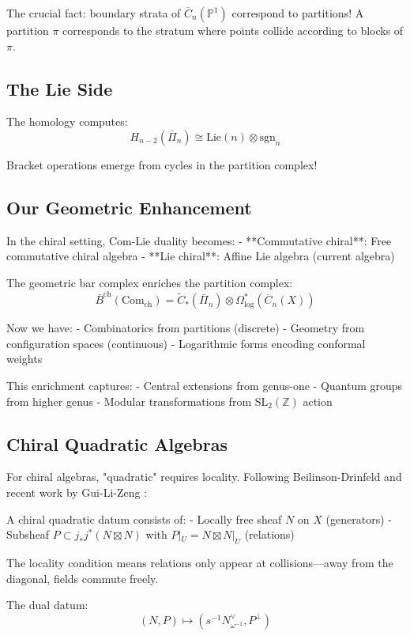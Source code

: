 The crucial fact: boundary strata of $\overline{C}_n(\mathbb{P}^1)$ correspond to partitions! A partition $\pi$ corresponds to the stratum where points collide according to blocks of $\pi$.

\subsection{The Lie Side}

The homology computes:
$$H_{n-2}(\bar{\Pi}_n) \cong \text{Lie}(n) \otimes \text{sgn}_n$$

Bracket operations emerge from cycles in the partition complex!

\subsection{Our Geometric Enhancement}

In the chiral setting, Com-Lie duality becomes:
- **Commutative chiral**: Free commutative chiral algebra
- **Lie chiral**: Affine Lie algebra (current algebra)

The geometric bar complex enriches the partition complex:
$$\bar{B}^{\text{ch}}(\text{Com}_{\text{ch}}) = \tilde{C}_*(\bar{\Pi}_n) \otimes \Omega^*_{\text{log}}(\overline{C}_n(X))$$

Now we have:
- Combinatorics from partitions (discrete)
- Geometry from configuration spaces (continuous)
- Logarithmic forms encoding conformal weights

This enrichment captures:
- Central extensions from genus-one  
- Quantum groups from higher genus
- Modular transformations from $\text{SL}_2(\mathbb{Z})$ action

\subsection{Chiral Quadratic Algebras}

For chiral algebras, "quadratic" requires locality. Following Beilinson-Drinfeld and recent work by Gui-Li-Zeng \cite{GL22}:

A chiral quadratic datum consists of:
- Locally free sheaf $N$ on $X$ (generators)
- Subsheaf $P \subset j_*j^*(N \boxtimes N)$ with $P|_U = N \boxtimes N|_U$ (relations)

The locality condition means relations only appear at collisions—away from the diagonal, fields commute freely.

The dual datum:
$$(N, P) \mapsto (s^{-1}N^{\vee}_{\omega^{-1}}, P^\perp)$$

